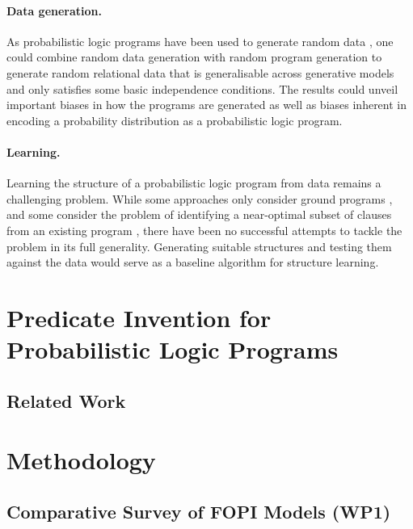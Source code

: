 \documentclass{article}
\begin{document}
\paragraph{Data generation.} As probabilistic logic programs have been used to
generate random data \cite{DBLP:conf/soict/Dries15}, one could combine random
data generation with random program generation to generate random relational
data that is generalisable across generative models and only satisfies some
basic independence conditions. The results could unveil important biases in how
the programs are generated as well as biases inherent in encoding a probability
distribution as a probabilistic logic program.

\paragraph{Learning.} Learning the structure of a probabilistic logic program
from data remains a challenging problem. While some approaches only consider
ground programs \cite{riguzzi2007learning,DBLP:journals/ml/Riguzzi08}, and some
consider the problem of identifying a near-optimal subset of clauses from an
existing program \cite{DBLP:conf/ilp/RaedtKKRT06}, there have been no successful
attempts to tackle the problem in its full generality. Generating suitable
structures and testing them against the data would serve as a baseline algorithm
for structure learning.

\section{Predicate Invention for Probabilistic Logic Programs}


\subsection{Related Work}

\section{Methodology}

\subsection{Comparative Survey of FOPI Models (WP1)}
\end{document}
